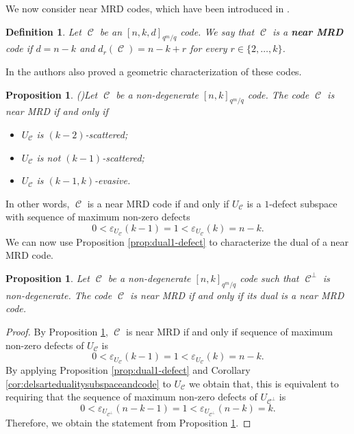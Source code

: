 \documentclass[11pt]{amsart}
\DeclareMathOperator{\C}{\mathcal{C}}
\newtheorem{definition}[theorem]{Definition}
\newtheorem{proposition}[theorem]{Proposition}
\begin{document}
We now consider near MRD codes, which have been introduced in \cite{marino2023evasive}. 

\begin{definition}
    Let $\C$ be an $[n,k,d]_{q^m/q}$ code. We say that $\C$ is a \textbf{near MRD} code if $d=n-k$ and $d_r(\C)=n-k+r$ for every $r \in \{2,\ldots,k\}$.
\end{definition}

In \cite{marino2023evasive} the authors also proved a geometric characterization of these codes.

\begin{proposition}(\cite[Proposition 5.3]{marino2023evasive})\label{prop:charnearMRDsystem}
    Let $\C$ be a non-degenerate $[n,k]_{q^m/q}$ code. The code $\C$ is near MRD if and only if 
    \begin{itemize}
        \item $U_{\C}$ is $(k-2)$-scattered;
        \item $U_{\C}$ is not $(k-1)$-scattered;
        \item $U_{\C}$ is $(k-1,k)$-evasive.
    \end{itemize}
\end{proposition}

In other words, $\C$ is a near MRD code if and only if $U_{\C}$ is a $1$-defect subspace with sequence of maximum non-zero defects
\[ 0 < \varepsilon_{U_{\C}}(k-1)=1<\varepsilon_{U_{\C}}(k)=n-k. \]
We can now use Proposition \ref{prop:dual1-defect} to characterize the dual of a near MRD code.

\begin{proposition}
    Let $\C$ be a non-degenerate $[n,k]_{q^m/q}$ code such that $\C^{\perp}$ is non-degenerate. The code $\C$ is near MRD if and only if its dual is a near MRD code.
\end{proposition}
\begin{proof}
    By Proposition \ref{prop:charnearMRDsystem}, $\C$ is near MRD if and only if sequence of maximum non-zero defects of $U_{\C}$ is 
    \[ 0 < \varepsilon_{U_{\C}}(k-1)=1<\varepsilon_{U_{\C}}(k)=n-k. \]
    By applying  Proposition \ref{prop:dual1-defect} and Corollary \ref{cor:delsartedualitysubspaceandcode} to $U_{\C}$ we obtain that, this is equivalent to requiring that the sequence of maximum non-zero defects of $U_{\C^\perp}$ is 
    \[ 0 < \varepsilon_{U_{\C^\perp}}(n-k-1)=1<\varepsilon_{U_{\C^\perp}}(n-k)=k. \] 
    Therefore, we obtain the statement from Proposition \ref{prop:charnearMRDsystem}.
\end{proof}
\end{document}
